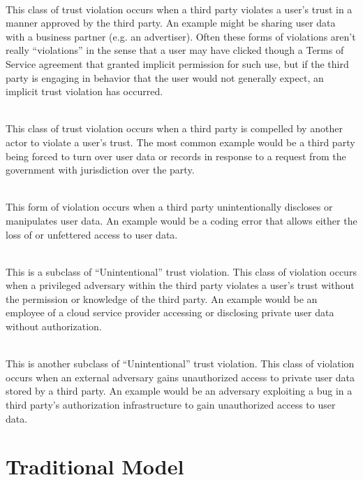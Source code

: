\begin{packed_desc}
\item[Implicit (P):] \hfill \\ This class of trust violation occurs
  when a third party violates a user's trust in a manner approved by
  the third party. An example might be sharing user data with a
  business partner (e.g. an advertiser). Often these forms of
  violations aren't really ``violations'' in the sense that a user may
  have clicked though a Terms of Service agreement that granted
  implicit permission for such use, but if the third party is engaging
  in behavior that the user would not generally expect, an implicit
  trust violation has occurred.
\item[Compelled (C):] \hfill \\ This class of trust violation occurs
  when a third party is compelled by another actor to violate a user's
  trust. The most common example would be a third party being forced
  to turn over user data or records in response to a request from the
  government with jurisdiction over the party.
\item[Unintentional (U):] \hfill \\ This form of violation occurs when
  a third party unintentionally discloses or manipulates user data. An
  example would be a coding error that allows either the loss of or
  unfettered access to user data.
\item[Insider (I):] \hfill \\ This is a subclass of ``Unintentional''
  trust violation. This class of violation occurs when a privileged
  adversary within the third party violates a user's trust without the
  permission or knowledge of the third party. An example would be an
  employee of a cloud service provider accessing or disclosing private
  user data without authorization.
\item[Outsider (O):] \hfill \\ This is another subclass of
  ``Unintentional'' trust violation. This class of violation occurs
  when an external adversary gains unauthorized access to private user
  data stored by a third party. An example would be an adversary
  exploiting a bug in a third party's authorization infrastructure to
  gain unauthorized access to user data.
\end{packed_desc}

\section{Traditional Model}
\label{chap:trust:traditional}


